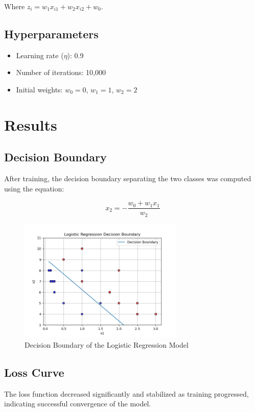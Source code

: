 \documentclass[a4paper, 12pt]{article}
\begin{document}
Where $z_i = w_1 x_{i1} + w_2 x_{i2} + w_0$.

\subsection{Hyperparameters}
\begin{itemize}
    \item Learning rate ($\eta$): 0.9
    \item Number of iterations: 10,000
    \item Initial weights: $w_0 = 0$, $w_1 = 1$, $w_2 = 2$
\end{itemize}

\section{Results}

\subsection{Decision Boundary}
After training, the decision boundary separating the two classes was computed using the equation:

\[
x_2 = -\frac{w_0 + w_1 x_1}{w_2}
\]

\begin{figure}[H]
    \centering
    \includegraphics[width=0.7\textwidth]{Figure_1.png}
    \caption{Decision Boundary of the Logistic Regression Model}
\end{figure}

\subsection{Loss Curve}
The loss function decreased significantly and stabilized as training progressed, indicating successful convergence of the model.
\end{document}
